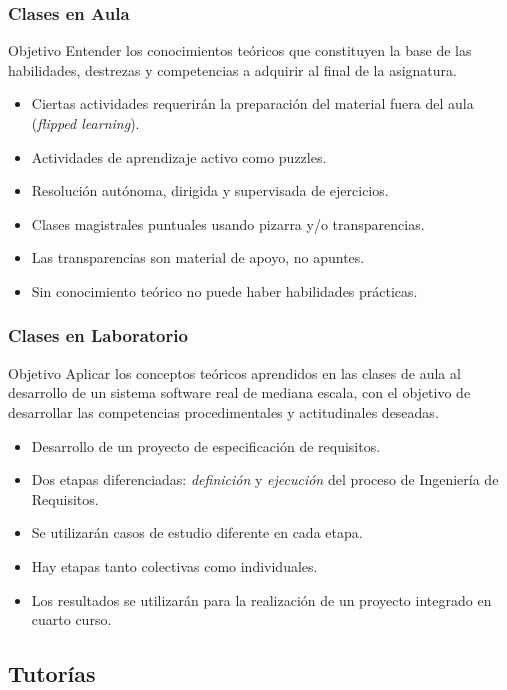 \documentclass[handout,a4paper,slidestop,xcolor=pst,dvips,blue]{beamer}
\begin{document}
\begin{frame}
	\frametitle{Clases en Aula}
	\begin{block}{Objetivo}
        Entender los conocimientos teóricos que constituyen la base de las habilidades, destrezas y competencias a adquirir al final de la asignatura.
	\end{block}
	\begin{itemize}
        \item<2-> Ciertas actividades requerirán la preparación del material fuera del aula (\emph{flipped learning}).
        \item<3-> Actividades de aprendizaje activo como puzzles. 
		\item<4-> Resolución autónoma, dirigida y supervisada de ejercicios.
		\item<5-> Clases magistrales puntuales usando pizarra y/o transparencias.
		\item<6-> \alert{Las transparencias} son material de apoyo, \alert{no apuntes}.
		\item<7-> \alert{Sin conocimiento teórico no puede haber habilidades prácticas}.
	\end{itemize}
\end{frame}

\begin{frame}[c]
	\frametitle{Clases en Laboratorio}
	\begin{block}{Objetivo}
		Aplicar los conceptos teóricos aprendidos en las clases de aula al desarrollo de un sistema software real de mediana escala, con el objetivo
        de desarrollar las competencias procedimentales y actitudinales deseadas.
	\end{block}
	\begin{itemize}
        \item<2-> Desarrollo de un proyecto de especificación de requisitos.
		\item<3-> Dos etapas diferenciadas: \emph{definición} y \emph{ejecución} del proceso de Ingeniería de Requisitos.
        \item<4-> Se utilizarán casos de estudio diferente en cada etapa.
        \item<5-> Hay etapas tanto colectivas como individuales.
        \item<6-> Los resultados se utilizarán para la realización de un proyecto integrado en cuarto curso.
	\end{itemize}
\end{frame}

\subsection{Tutorías}
\end{document}

